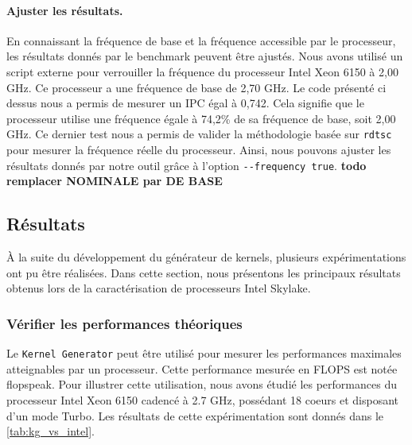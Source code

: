     
    
        \paragraph{Ajuster les résultats.} En connaissant la fréquence de base et la fréquence accessible par le processeur, les résultats donnés par le benchmark peuvent être ajustés. Nous avons utilisé un script externe pour verrouiller la fréquence du processeur Intel Xeon 6150 à 2,00 GHz. Ce processeur a une fréquence de base de 2,70 GHz. Le code présenté ci dessus nous a permis de mesurer un \gls{IPC} égal à 0,742. Cela signifie que le processeur utilise une fréquence égale à 74,2\% de sa fréquence de base, soit 2,00 GHz. Ce dernier test nous a permis de valider la méthodologie basée sur \verb|rdtsc| pour mesurer la fréquence réelle du processeur. Ainsi, nous pouvons ajuster les résultats donnés par notre outil grâce à l'option \verb|--frequency true|.
        \textbf{todo remplacer NOMINALE par DE BASE}

    
\subsection{Résultats}
    À la suite du développement du générateur de \glspl{kernel}, plusieurs expérimentations ont pu être réalisées. Dans cette section, nous présentons les principaux résultats obtenus lors de la caractérisation de processeurs Intel Skylake.
   
   
   

    \subsubsection{Vérifier les performances théoriques}
    Le \verb|Kernel Generator| peut être utilisé pour mesurer les performances maximales atteignables par un processeur. Cette performance mesurée en \gls{FLOPS} est notée \gls{flopspeak}. Pour illustrer cette utilisation, nous avons étudié les performances du processeur Intel Xeon 6150 cadencé à 2.7 GHz, possédant 18 coeurs et disposant d'un mode Turbo. Les résultats de cette expérimentation sont donnés dans le \autoref{tab:kg_vs_intel}. 
    
